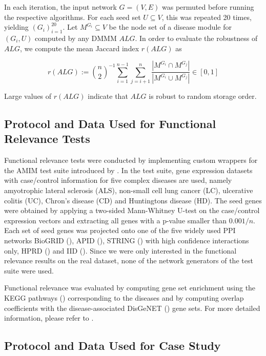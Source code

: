 \documentclass{bioinfo}
\begin{document}
In each iteration, the input network $G=(V,E)$ was permuted before running the respective algorithms. For each seed set $U \subseteq V$, this was repeated 20 times, yielding $(G_i)_{i=1}^{20}$. Let $M^{G_i} \subseteq V$ be the node set of a disease module for $(G_i,U)$ computed by any DMMM $ALG$. In order to evaluate the robustness of $ALG$, we compute the mean Jaccard index $r(ALG)$ as

\begin{equation}
    r(ALG) := \binom{n}{2}^{-1} \sum_{i=1}^{n-1} \sum_{j=i+1}^{n} \frac{|M^{G_i} \cap M^{G_j}|}{|M^{G_i} \cup M^{G_j}|} \in [0,1]
\end{equation}

Large values of $r(ALG)$ indicate that $ALG$ is robust to random storage order.

\subsection{Protocol and Data Used for Functional Relevance Tests}

Functional relevance tests were conducted by implementing custom wrappers for the AMIM test suite introduced by \cite{amim_lazareva2021}. In the test suite, gene expression datasets with case/control information for five complex diseases are used, namely amyotrophic lateral sclerosis (ALS), non-small cell lung cancer (LC), ulcerative colitis (UC), Chron's disease (CD) and Huntingtons disease (HD). The seed genes were obtained by applying a two-sided Mann-Whitney U-test on the case/control expression vectors and extracting all genes with a p-value smaller than $0.001/n$. Each set of seed genes was projected onto one of the five widely used PPI networks BioGRID (\cite{biogrid_oughtred2019}), APID (\cite{apid_alonso2016,apid_alonso2019}), STRING (\cite{string_szklarczyk2019}) with high confidence interactions only, HPRD (\cite{hprd_keshava2009}) and IID (\cite{iid_kotlyar2019}). Since we were only interested in the functional relevance results on the real dataset, none of the network generators of the test suite were used. 

Functional relevance was evaluated by computing gene set enrichment using the KEGG pathways (\cite{kegg_kanehisa2016}) corresponding to the diseases and by computing overlap coefficients with the disease-associated DisGeNET (\cite{disgenet_pinero2020}) gene sets. For more detailed information, please refer to \cite{amim_lazareva2021}.

\subsection{Protocol and Data Used for Case Study}
\end{document}
